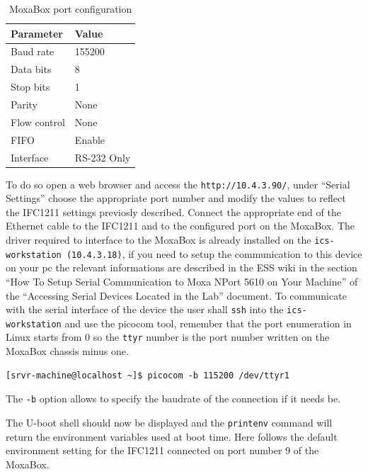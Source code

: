 \documentclass[11pt
  , a4paper
  , article
  , oneside
  , showtrims
]{memoir}
\begin{document}
\begin{table}[!htb]
	\centering
	\begin{tabular}{l|l}
		\toprule\rowcolor{gray!15}
		Parameter          & Value                        \\\midrule
		Baud rate          & 155200                       \\\midrule
		Data bits          & 8                            \\\midrule
		Stop bits          & 1                            \\\midrule
		Parity             & None                         \\\midrule
		Flow control       & None                         \\\midrule
		FIFO               & Enable                       \\\midrule
		Interface          & RS-232 Only                  \\\bottomrule
	\end{tabular}
	\caption[]{MoxaBox port configuration}
	\label{table:moxa_serial}
\end{table}

To do so open a web browser and access the \texttt{http://10.4.3.90/}, under ``Serial Settings'' choose the appropriate port number and modify the values to reflect the IFC1211 settings previosly described.
Connect the appropriate end of the Ethernet cable to the IFC1211 and to the configured port on the MoxaBox.
The driver required to interface to the MoxaBox is already installed on the \texttt{ics-workstation (10.4.3.18)}, if you need to setup the communication to this device on your pc the relevant informations are described in the ESS wiki in the section ``How To Setup Serial Communication to Moxa NPort 5610 on Your Machine'' of the ``Accessing Serial Devices Located in the Lab''\cite{ASDLL} document.
To communicate with the serial interface of the device the user shall \texttt{ssh} into the \texttt{ics-workstation} and use the picocom tool, remember that the port enumeration in Linux starts from 0 so the \texttt{ttyr} number is the port number written on the MoxaBox chassis minus one.
\begin{lstlisting}[style=termstyle]
[srvr-machine@localhost ~]$ picocom -b 115200 /dev/ttyr1
\end{lstlisting}
The \texttt{-b} option allows to specify the baudrate of the connection if it needs be.

The U-boot shell should now be displayed and the \texttt{printenv} command will return the environment variables used at boot time. Here follows the default environment setting for the IFC1211 connected on port number 9 of the MoxaBox.
\end{document}
